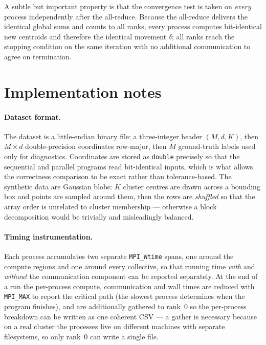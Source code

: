 \documentclass[11pt,a4paper]{article}
\begin{document}
A subtle but important property is that the convergence test is taken on
\emph{every} process independently after the all-reduce. Because the all-reduce
delivers the identical global sums and counts to all ranks, every process
computes bit-identical new centroids and therefore the identical movement
$\delta$; all ranks reach the stopping condition on the same iteration with no
additional communication to agree on termination.

\section{Implementation notes}
\label{sec:impl}

\paragraph{Dataset format.}
The dataset is a little-endian binary file: a three-integer header
$(M,d,K)$, then $M\times d$ double-precision coordinates row-major, then $M$
ground-truth labels used only for diagnostics. Coordinates are stored as
\texttt{double} precisely so that the sequential and parallel programs read
bit-identical inputs, which is what allows the correctness comparison to be exact
rather than tolerance-based. The synthetic data are Gaussian blobs: $K$ cluster
centres are drawn across a bounding box and points are sampled around them, then
the rows are \emph{shuffled} so that the array order is unrelated to cluster
membership --- otherwise a block decomposition would be trivially and misleadingly
balanced.

\paragraph{Timing instrumentation.}
Each process accumulates two separate \texttt{MPI\_Wtime} spans, one around the
compute regions and one around every collective, so that running time
\emph{with} and \emph{without} the communication component can be reported
separately. At the end of a run the per-process compute, communication and wall
times are reduced with \texttt{MPI\_MAX} to report the critical path (the slowest
process determines when the program finishes), and are additionally gathered to
rank~0 so the per-process breakdown can be written as one coherent CSV --- a
gather is necessary because on a real cluster the processes live on different
machines with separate filesystems, so only rank~0 can write a single file.
\end{document}
